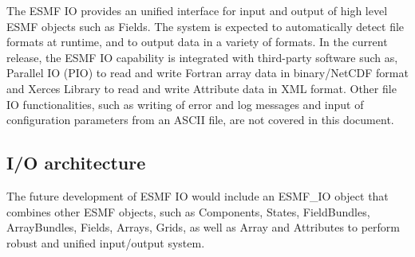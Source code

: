 

The ESMF IO provides an unified interface for input and output of
high level ESMF objects such as Fields.  The system is expected to
automatically detect file formats at runtime, and to output data in 
a variety of formats. In the current release, the ESMF IO capability
is integrated with third-party software such as, Parallel IO (PIO)
to read and write Fortran array data in binary/NetCDF format and Xerces
Library to read and write Attribute data in XML format.  Other file IO
functionalities, such as writing of error and log messages and input of
configuration parameters from an ASCII file, are not covered in this
document.


\subsection{I/O architecture}

The future development of ESMF IO would include an ESMF\_IO object that
combines other ESMF objects, such as Components, States, FieldBundles,
ArrayBundles, Fields, Arrays, Grids, as well as Array and Attributes to 
perform robust and unified input/output system.



